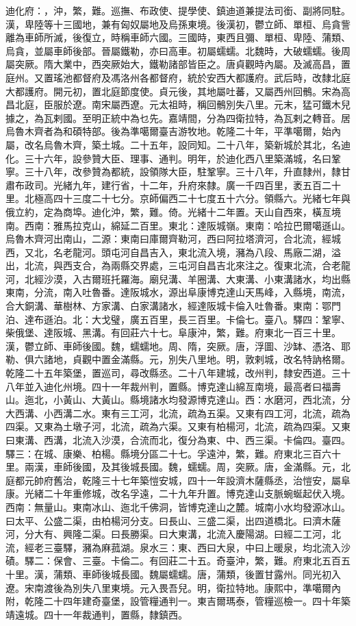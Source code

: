 \begin{pinyinscope}
迪化府：，沖，繁，難。巡撫、布政使、提學使、鎮迪道兼提法司銜、副將同駐。漢，卑陸等十三國地，兼有匈奴屬地及烏孫東境。後漢初，鬱立師、單桓、烏貪訾離為車師所滅，後復立，時稱車師六國。三國時，東西且彌、單桓、卑陸、蒲類、烏貪，並屬車師後部。晉屬鐵勒，亦曰高車。初屬蠕蠕。北魏時，大破蠕蠕。後周屬突厥。隋大業中，西突厥始大，鐵勒諸部皆臣之。唐貞觀時內屬。及滅高昌，置庭州。又置瑤池都督府及馮洛州各都督府，統於安西大都護府。武后時，改隸北庭大都護府。開元初，置北庭節度使。貞元後，其地屬吐蕃，又屬西州回鶻。宋為高昌北庭，臣服於遼。南宋屬西遼。元太祖時，稱回鶻別失八里。元末，猛可鐵木兒據之，為瓦剌國。至明正統中為乜先。嘉靖間，分為四衛拉特，為瓦剌之轉音。居烏魯木齊者為和碩特部。後為準噶爾臺吉游牧地。乾隆二十年，平準噶爾，始內屬，改名烏魯木齊，築土城。二十五年，設同知。二十八年，築新城於其北，名迪化。三十六年，設參贊大臣、理事、通判。明年，於迪化西八里築滿城，名曰鞏寧。三十八年，改參贊為都統，設領隊大臣，駐鞏寧。三十八年，升直隸州，隸甘肅布政司。光緒九年，建行省，十二年，升府來隸。廣一千四百里，袤五百二十里。北極高四十三度二十七分。京師偏西二十七度五十六分。領縣六。光緒七年與俄立約，定為商埠。迪化沖，繁，難。倚。光緒十二年置。天山自西來，橫亙境南。西南：雅馬拉克山，綿延二百里。東北：達阪城嶺。東南：哈拉巴爾噶遜山。烏魯木齊河出南山，二源：東南曰庫爾齊勒河，西曰阿拉塔濟河，合北流，經城西，又北，名老龍河。頭屯河自昌吉入，東北流入境，瀦為八段、馬廠二湖，溢出，北流，與西支合，為兩縣交界處，三屯河自昌吉北來注之。復東北流，合老龍河，北經沙漠，入古爾班托羅海。廟兒溝、羊圈溝、大東溝、小東溝諸水，均出縣東南，分流，南入吐魯番。達阪城水，源出阜康博克達山天馬峰，入縣境，南流，合大銅溝、華樹林、方家溝、白家溝諸水，經達阪城卡倫入吐魯番。東南：鄂門泊、達布遜泊。北：大戈璧，廣五百里，長三百里。卡倫七。臺八。驛四：鞏寧、柴俄堡、達阪城、黑溝。有回莊六十七。阜康沖，繁，難。府東北一百三十里。漢，鬱立師、車師後國。魏，蠕蠕地。周、隋，突厥。唐，浮圖、沙缽、憑洛、耶勒、俱六諸地，貞觀中置金滿縣。元，別失八里地。明，敦剌城，改名特訥格爾。乾隆二十五年築堡，置巡司，尋改縣丞。二十八年建城，改州判，隸安西道。三十八年並入迪化州境。四十一年裁州判，置縣。博克達山綿亙南境，最高者曰福壽山。迤北，小黃山、大黃山。縣境諸水均發源博克達山。西：水磨河，西北流，分大西溝、小西溝二水。東有三工河，北流，疏為五渠。又東有四工河，北流，疏為四渠。又東為土墩子河，北流，疏為六渠。又東有柏楊河，北流，疏為四渠。又東曰東溝、西溝，北流入沙漠，合流而北，復分為東、中、西三渠。卡倫四。臺四。驛三：在城、康樂、柏楊。縣境分區二十七。孚遠沖，繁，難。府東北三百六十里。兩漢，車師後國，及其後城長國。魏，蠕蠕。周，突厥。唐，金滿縣。元，北庭都元帥府舊治，乾隆三十七年築愷安城，四十一年設濟木薩縣丞，治愷安，屬阜康。光緒二十年重修城，改名孚遠，二十九年升置。博克達山支脈蜿蜒起伏入境。西南：無量山。東南冰山、迤北千佛洞，皆博克達山之麓。城南小水均發源冰山。曰太平、公盛二渠，由柏楊河分支。曰長山、三盛二渠，出四道橋北。曰濟木薩河，分大有、興隆二渠。曰長勝渠。曰大東溝，北流入慶陽湖。曰經二工河，北流，經老三臺驛，瀦為麻菰湖。泉水三：東、西曰大泉，中曰上暖泉，均北流入沙磧。驛二：保會、三臺。卡倫二。有回莊二十五。奇臺沖，繁，難。府東北五百五十里。漢，蒲類、車師後城長國。魏屬蠕蠕。唐，蒲類，後置甘露州。同光初入遼。宋南渡後為別失八里東境。元入畏吾兒。明，衛拉特地。康熙中，準噶爾內附，乾隆二十四年建奇臺堡，設管糧通判一。東吉爾瑪泰，管糧巡檢一。四十年築靖遠城。四十一年裁通判，置縣，隸鎮西。
\end{pinyinscope}
